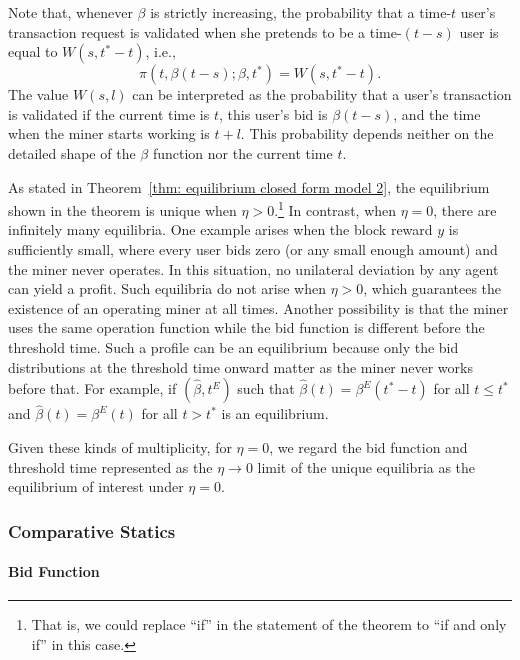 \documentclass[12pt, letterpaper]{article}
\begin{document}
Note that, whenever $\beta$ is strictly increasing, the probability that a time-$t$ user's transaction request is validated when she pretends to be a time-$(t - s)$ user is equal to $W(s, t^* - t)$, i.e.,
\begin{equation}
    \pi(t, \beta(t - s); \beta, t^*) = W(s, t^*-t).
\end{equation}
The value $W(s, l)$ can be interpreted as the probability that a user's transaction is validated if the current time is $t$, this user's bid is $\beta(t - s)$, and the time when the miner starts working is $t + l$. This probability depends neither on the detailed shape of the $\beta$ function nor the current time $t$.


As stated in Theorem~\ref{thm: equilibrium closed form model 2}, the equilibrium shown in the theorem is unique when $\eta > 0$.\footnote{That is, we could replace ``if'' in the statement of the theorem to ``if and only if'' in this case.} In contrast, when $\eta= 0$, there are infinitely many equilibria. One example arises when the block reward $y$ is sufficiently small, where every user bids zero (or any small enough amount) and the miner never operates. In this situation, no unilateral deviation by any agent can yield a profit. Such equilibria do not arise when $\eta > 0$, which guarantees the existence of an operating miner at all times. 
Another possibility is that the miner uses the same operation function while the bid function is different before the threshold time. Such a profile can be an equilibrium because only the bid distributions at the threshold time onward matter as the miner never works before that. For example, if $(\hat{\beta},t^E)$ such that $\hat{\beta}(t)=\beta^E(t^*-t)$ for all $t\leq t^*$ and $\hat{\beta}(t)=\beta^E(t)$ for all $t> t^*$ is an equilibrium. 

Given these kinds of multiplicity, for $\eta = 0$, we regard the bid function and threshold time represented as the $\eta \to 0$ limit of the unique equilibria as the equilibrium of interest under $\eta = 0$.




\subsubsection{Comparative Statics}

\paragraph{Bid Function}
\end{document}

